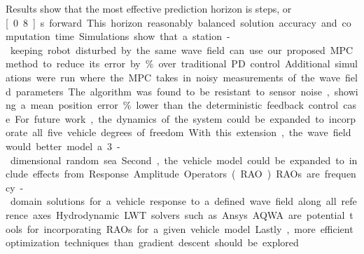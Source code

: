 \documentclass[letterpaper, 10 pt, conferences]{IEEEconf}  %
\begin{document}
Results show that the most effective prediction horizon is \unit[4]{steps}, or \unit[0.8]{s} forward. This horizon reasonably balanced solution accuracy and computation time. Simulations show that a station-keeping robot disturbed by the same wave field can use our proposed MPC method to reduce its error by \unit[74]{\%} over traditional PD control. Additional simulations were run where the MPC takes in noisy measurements of the wave field parameters. The algorithm was found to be resistant to sensor noise, showing a mean position error \unit[44]{\%} lower than the deterministic feedback control case.

For future work, the dynamics of the system could be expanded to incorporate all five vehicle degrees of freedom. With this extension, the wave field would better model a 3-dimensional random sea. Second, the vehicle model could be expanded to include effects from Response Amplitude Operators (RAO). RAOs are frequency-domain solutions for a vehicle response to a defined wave field along all reference axes. Hydrodynamic LWT solvers such as Ansys AQWA are potential tools for incorporating RAOs for a given vehicle model. Lastly, more efficient optimization techniques than gradient descent should be explored.

\nocite{geoffadapt, geoffuncertainty, ballard}








% 








\end{document}
